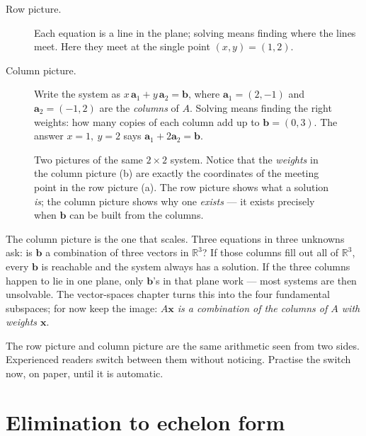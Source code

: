 \begin{description}
  \item[Row picture.] Each equation is a line in the plane; solving means finding where the lines meet. Here they meet at the single point $(x,y)=(1,2)$.
  \item[Column picture.] Write the system as
  \(
    x\,\mathbf{a}_1 + y\,\mathbf{a}_2 = \mathbf{b}
  \),
  where $\mathbf{a}_1=(2,-1)$ and $\mathbf{a}_2=(-1,2)$ are the \emph{columns} of $A$. Solving means finding the right weights: how many copies of each column add up to $\mathbf{b}=(0,3)$. The answer $x=1,\ y=2$ says $\mathbf{a}_1 + 2\mathbf{a}_2 = \mathbf{b}$.
\end{description}

\begin{figure}[htbp]
\centering

\caption{Two pictures of the same $2\times2$ system. Notice that the \emph{weights} in the column picture (b) are exactly the coordinates of the meeting point in the row picture (a). The row picture shows what a solution \emph{is}; the column picture shows why one \emph{exists} — it exists precisely when $\mathbf{b}$ can be built from the columns.}
\label{fig:rowcol}
\end{figure}

The column picture is the one that scales. Three equations in three unknowns ask: is $\mathbf{b}$ a combination of three vectors in $\mathbb{R}^3$? If those columns fill out all of $\mathbb{R}^3$, every $\mathbf{b}$ is reachable and the system always has a solution. If the three columns happen to lie in one plane, only $\mathbf{b}$'s in that plane work — most systems are then unsolvable. The vector-spaces chapter turns this into the four fundamental subspaces; for now keep the image: \emph{$A\mathbf{x}$ is a combination of the columns of $A$ with weights $\mathbf{x}$}.

\begin{remark}
The row picture and column picture are the same arithmetic seen from two sides. Experienced readers switch between them without noticing. Practise the switch now, on paper, until it is automatic.
\end{remark}

\section{Elimination to echelon form}\label{sec:elim}


